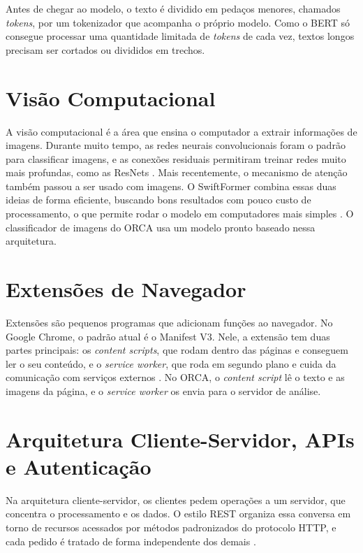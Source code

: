 \documentclass[
    12pt,           %
    oneside,        %
    a4paper,        %
    chapter=TITLE,  %
    english,        %
    brazil          %
]{abntex2}
\begin{document}
Antes de chegar ao modelo, o texto é dividido em pedaços menores, chamados
\textit{tokens}, por um tokenizador que acompanha o próprio modelo. Como o
BERT só consegue processar uma quantidade limitada de \textit{tokens} de cada
vez, textos longos precisam ser cortados ou divididos em trechos.

\section{Visão Computacional}

A visão computacional é a área que ensina o computador a extrair informações
de imagens. Durante muito tempo, as redes neurais convolucionais foram o
padrão para classificar imagens, e as conexões residuais permitiram treinar
redes muito mais profundas, como as ResNets \cite{he2016}. Mais recentemente,
o mecanismo de atenção também passou a ser usado com imagens. O SwiftFormer
combina essas duas ideias de forma eficiente, buscando bons resultados com
pouco custo de processamento, o que permite rodar o modelo em computadores
mais simples \cite{shaker2023}. O classificador de imagens do ORCA usa um
modelo pronto baseado nessa arquitetura.

\section{Extensões de Navegador}

Extensões são pequenos programas que adicionam funções ao navegador. No Google
Chrome, o padrão atual é o Manifest V3. Nele, a extensão tem duas partes
principais: os \textit{content scripts}, que rodam dentro das páginas e
conseguem ler o seu conteúdo, e o \textit{service worker}, que roda em segundo
plano e cuida da comunicação com serviços externos \cite{chromeext}. No ORCA,
o \textit{content script} lê o texto e as imagens da página, e o
\textit{service worker} os envia para o servidor de análise.

\section{Arquitetura Cliente-Servidor, APIs e Autenticação}

Na arquitetura cliente-servidor, os clientes pedem operações a um servidor,
que concentra o processamento e os dados. O estilo REST organiza essa conversa
em torno de recursos acessados por métodos padronizados do protocolo HTTP,
e cada pedido é tratado de forma independente dos demais \cite{fielding2000}.
\end{document}
